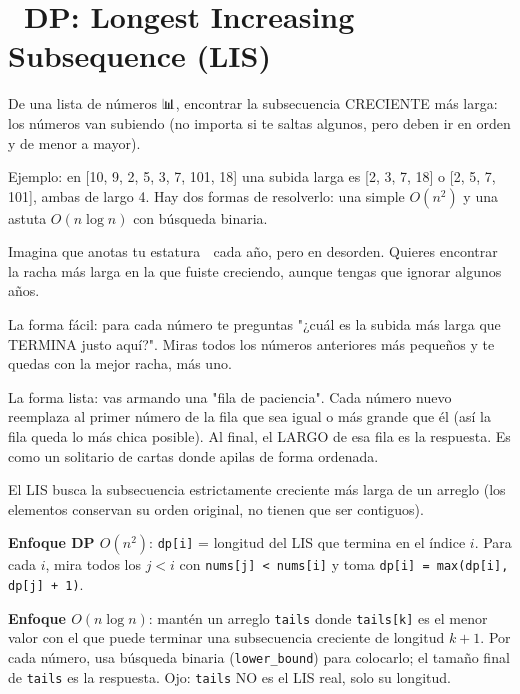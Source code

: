 \chapter[\emj{📈}~DP: Longest Increasing Subsequence (LIS)]{~DP: Longest Increasing Subsequence (LIS)}

\begin{dsaquees}

De una lista de números 📊, encontrar la subsecuencia CRECIENTE más larga:
los números van subiendo (no importa si te saltas algunos, pero deben ir
en orden y de menor a mayor).

Ejemplo: en [10, 9, 2, 5, 3, 7, 101, 18] una subida larga es [2, 3, 7,
18] o [2, 5, 7, 101], ambas de largo 4. Hay dos formas de resolverlo: una
simple $O(n^2)$ y una astuta $O(n \log n)$ con búsqueda binaria.

\end{dsaquees}

\begin{dsanino}

Imagina que anotas tu estatura 📏 cada año, pero en desorden. Quieres
encontrar la racha más larga en la que fuiste creciendo, aunque tengas
que ignorar algunos años.

La forma fácil: para cada número te preguntas "¿cuál es la subida más
larga que TERMINA justo aquí?". Miras todos los números anteriores más
pequeños y te quedas con la mejor racha, más uno.

La forma lista: vas armando una "fila de paciencia". Cada número nuevo
reemplaza al primer número de la fila que sea igual o más grande que él
(así la fila queda lo más chica posible). Al final, el LARGO de esa fila
es la respuesta. Es como un solitario de cartas donde apilas de forma
ordenada.

\end{dsanino}

\begin{dsaotraforma}

El LIS busca la subsecuencia estrictamente creciente más larga de un
arreglo (los elementos conservan su orden original, no tienen que ser
contiguos).

\textbf{Enfoque DP $O(n^2)$}: \verb|dp[i]| = longitud del LIS que termina
en el índice $i$. Para cada $i$, mira todos los $j < i$ con
\verb|nums[j] < nums[i]| y toma \verb|dp[i] = max(dp[i], dp[j] + 1)|.

\textbf{Enfoque $O(n \log n)$}: mantén un arreglo \verb|tails| donde
\verb|tails[k]| es el menor valor con el que puede terminar una
subsecuencia creciente de longitud $k+1$. Por cada número, usa búsqueda
binaria (\verb|lower_bound|) para colocarlo; el tamaño final de
\verb|tails| es la respuesta. Ojo: \verb|tails| NO es el LIS real, solo
su longitud.

\end{dsaotraforma}

